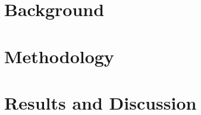 \documentclass[11pt, oneside, openright]{Thesis} %
\begin{document}
\pagestyle{fancy} %



\part{Background}
 

\part{Methodology}
 
 
 
\part{Results and Discussion}
 
 



\appendix %








\backmatter


\label{Bibliography}

\end{document}

